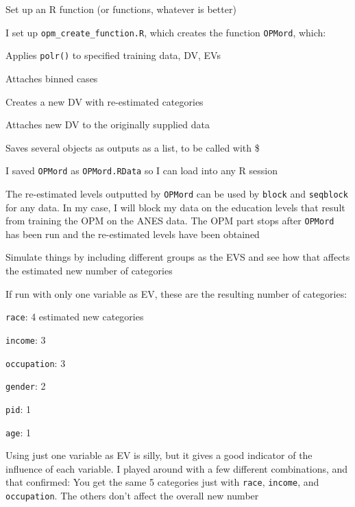 \begin{coi}
\begin{coi}
\begin{coi}
					\end{coi}
			\end{coi}
		\item Set up an R function (or functions, whatever is better)
			\begin{coi}
				\item I set up \texttt{opm\_create\_function.R}, which creates the function \texttt{OPMord}, which:
						\begin{coi}
							\item Applies \texttt{polr()} to specified training data, DV, EVs
							\item Attaches binned cases
							\item Creates a new DV with re-estimated categories
							\item Attaches new DV to the originally supplied data
							\item Saves several objects as outputs as a list, to be called with \$
						\end{coi}
				\item I saved \texttt{OPMord} as \texttt{OPMord.RData} so I can load into any R session
				\item The re-estimated levels outputted by \texttt{OPMord} can be used by \texttt{block} and \texttt{seqblock} for any data. In my case, I will block my data on the education levels that result from training the OPM on the ANES data. The OPM part stops after \texttt{OPMord} has been run and the re-estimated levels have been obtained
			\end{coi}
		\item Simulate things by including different groups as the EVS and see how that affects the estimated new number of categories
			\begin{coi}
				\item If run with only one variable as EV, these are the resulting number of categories:
					\begin{coi}
						\item \texttt{race}: 4 estimated new categories
						\item \texttt{income}: 3
						\item \texttt{occupation}: 3
						\item \texttt{gender}: 2
						\item \texttt{pid}: 1
						\item \texttt{age}: 1
					\end{coi}
				\item Using just one variable as EV is silly, but it gives a good indicator of the influence of each variable. I played around with a few different combinations, and that confirmed: You get the same 5 categories just with \texttt{race}, \texttt{income}, and \texttt{occupation}. The others don't affect the overall new number

\end{coi}
\end{coi}
